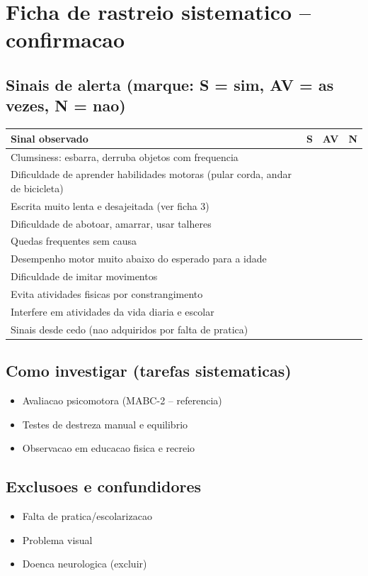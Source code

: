 \documentclass[a4paper,11pt]{book}
\begin{document}
\section*{Ficha de rastreio sistematico -- confirmacao}
\subsection*{Sinais de alerta (marque: S = sim, AV = as vezes, N = nao)}
\begin{tabular}{@{}p{11.5cm}ccc@{}}\toprule
Sinal observado & S & AV & N \\\midrule
Clumsiness: esbarra, derruba objetos com frequencia & & & \\
Dificuldade de aprender habilidades motoras (pular corda, andar de bicicleta) & & & \\
Escrita muito lenta e desajeitada (ver ficha 3) & & & \\
Dificuldade de abotoar, amarrar, usar talheres & & & \\
Quedas frequentes sem causa & & & \\
Desempenho motor muito abaixo do esperado para a idade & & & \\
Dificuldade de imitar movimentos & & & \\
Evita atividades fisicas por constrangimento & & & \\
Interfere em atividades da vida diaria e escolar & & & \\
Sinais desde cedo (nao adquiridos por falta de pratica) & & & \\
\bottomrule\end{tabular}
\subsection*{Como investigar (tarefas sistematicas)}
\begin{itemize}
\item Avaliacao psicomotora (MABC-2 -- referencia)
\item Testes de destreza manual e equilibrio
\item Observacao em educacao fisica e recreio
\end{itemize}
\subsection*{Exclusoes e confundidores}
\begin{itemize}
\item Falta de pratica/escolarizacao
\item Problema visual
\item Doenca neurologica (excluir)
\end{itemize}
\end{document}
